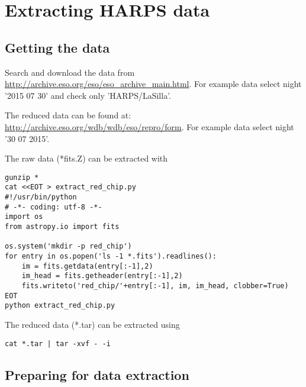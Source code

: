 \documentclass[10pt,a4paper]{article}
\begin{document}
\section{Extracting HARPS data}

\subsection{Getting the data}
Search and download the data from \url{http://archive.eso.org/eso/eso_archive_main.html}. For example data select night '2015 07 30' and check only 'HARPS/LaSilla'.

The reduced data can be found at: \url{http://archive.eso.org/wdb/wdb/eso/repro/form}. For example data select night '30 07 2015'.

The raw data (*fits.Z) can be extracted with
\begin{lstlisting}[style=base]
gunzip *
cat <<EOT > extract_red_chip.py
#!/usr/bin/python
# -*- coding: utf-8 -*-
import os
from astropy.io import fits

os.system('mkdir -p red_chip')
for entry in os.popen('ls -1 *.fits').readlines():
    im = fits.getdata(entry[:-1],2)
    im_head = fits.getheader(entry[:-1],2)
    fits.writeto('red_chip/'+entry[:-1], im, im_head, clobber=True)
EOT
python extract_red_chip.py
\end{lstlisting}


The reduced data (*.tar) can be extracted using
\begin{lstlisting}[style=base]
cat *.tar | tar -xvf - -i
\end{lstlisting}

\subsection{Preparing for data extraction}
\end{document}
